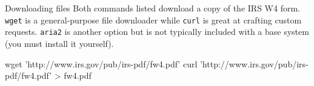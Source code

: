\begin{block}{Downloading files}
  Both commands listed download a copy of the IRS W4 form. \texttt{wget} is a general-purpose file downloader while \texttt{curl} is great at crafting custom requests. \texttt{aria2} is another option but is not typically included with a base system (you must install it yourself).
  \begin{indented}
    \begin{bashcode}
      wget 'http://www.irs.gov/pub/irs-pdf/fw4.pdf'
      curl 'http://www.irs.gov/pub/irs-pdf/fw4.pdf' > fw4.pdf
    \end{bashcode}
  \end{indented}
\end{block}
